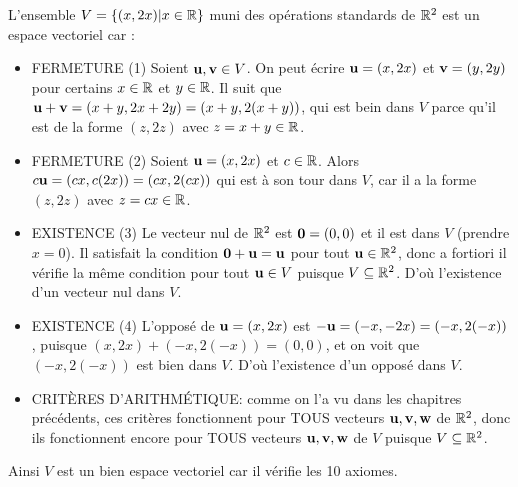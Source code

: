 \begin{myexample} L'ensemble $V = \{(x,2x) | x \in \mathbb{R}\}$ muni des opérations standards
de $\mathbb{R}^2$ est un espace vectoriel car :
\begin{itemize}
\item FERMETURE (1) Soient $\mathbf{u}, \mathbf{v} \in V$.  On peut écrire $\mathbf{u} = (x,2x)$ et $\mathbf{v} = (y,2y)$ pour certains
$x\in \mathbb{R}$ et $y\in \mathbb{R}$. Il suit que $\mathbf{u} + \mathbf{v} = (x+y, 2x+2y) = (x+y, 2(x+y))$, qui est bein dans $V$ parce qu'il est de la forme $(z,2z)$ 
avec $z = x+y \in \mathbb{R}$.
\item FERMETURE (2) Soient $\mathbf{u} = (x,2x)$ et $c\in \mathbb{R}$.  Alors $c\mathbf{u} = (cx,c(2x))=(cx,2(cx))$ qui est à son tour dans $V$, car il a la forme $(z,2z)$ avec $z=cx\in \mathbb{R}$.
\item EXISTENCE (3) Le vecteur nul de $\mathbb{R}^2$ est $\mathbf{0} = (0,0)$ et il est dans $V$ (prendre $x=0$). Il satisfait la condition $\mathbf{0} + \mathbf{u} = \mathbf{u}$ pour tout $\mathbf{u} \in\mathbb{R}^2$, donc a fortiori il vérifie la même condition pour tout $\mathbf{u} \in V$ puisque $V\subseteq\mathbb{R}^2$.  D'où l'existence d'un vecteur nul dans $V$.
\item EXISTENCE (4) L'opposé de $\mathbf{u} = (x,2x)$ est $-\mathbf{u}=(-x,-2x) = (-x,2(-x))$, puisque $(x,2x)+(-x,2(-x))=(0,0)$, et on voit que $(-x,2(-x))$ est bien dans $V$.  D'où l'existence d'un oppos\'e dans $V$.
\item CRIT\`ERES D'ARITHM\'ETIQUE: comme on l'a vu dans les chapitres précédents, ces critères fonctionnent pour TOUS vecteurs $\mathbf{u}, \mathbf{v}, \mathbf{w}$ de $\mathbb{R}^2$, donc ils fonctionnent encore  
pour TOUS vecteurs $\mathbf{u}, \mathbf{v},\mathbf{w}$ de $V$ puisque $V\subseteq \mathbb{R}^2$.
\end{itemize}
Ainsi $V$ est un bien espace vectoriel car il vérifie les 10 axiomes. \end{myexample}

